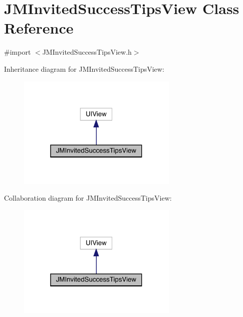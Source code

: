 \hypertarget{interface_j_m_invited_success_tips_view}{}\section{J\+M\+Invited\+Success\+Tips\+View Class Reference}
\label{interface_j_m_invited_success_tips_view}


{\ttfamily \#import $<$J\+M\+Invited\+Success\+Tips\+View.\+h$>$}



Inheritance diagram for J\+M\+Invited\+Success\+Tips\+View\+:\nopagebreak
\begin{figure}[H]
\begin{center}
\leavevmode
\includegraphics[width=217pt]{interface_j_m_invited_success_tips_view__inherit__graph}
\end{center}
\end{figure}


Collaboration diagram for J\+M\+Invited\+Success\+Tips\+View\+:\nopagebreak
\begin{figure}[H]
\begin{center}
\leavevmode
\includegraphics[width=217pt]{interface_j_m_invited_success_tips_view__coll__graph}
\end{center}
\end{figure}
